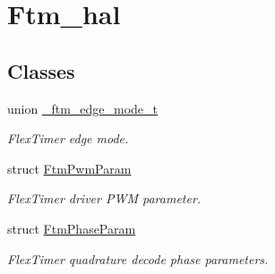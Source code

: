 \hypertarget{group__ftm__hal}{}\section{Ftm\+\_\+hal}
\label{group__ftm__hal}
\subsection*{Classes}
\begin{DoxyCompactItemize}
\item 
union \hyperlink{union__ftm__edge__mode__t}{\+\_\+ftm\+\_\+edge\+\_\+mode\+\_\+t}
\begin{DoxyCompactList}\small\item\em Flex\+Timer edge mode. \end{DoxyCompactList}\item 
struct \hyperlink{structFtmPwmParam}{Ftm\+Pwm\+Param}
\begin{DoxyCompactList}\small\item\em Flex\+Timer driver P\+WM parameter. \end{DoxyCompactList}\item 
struct \hyperlink{structFtmPhaseParam}{Ftm\+Phase\+Param}
\begin{DoxyCompactList}\small\item\em Flex\+Timer quadrature decode phase parameters. \end{DoxyCompactList}\end{DoxyCompactItemize}

